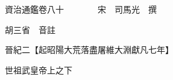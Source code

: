 










 


 
 


 

  
  
  
  
  





  
  
  
  
  
 
  

  

  
  
  



  

 
 

  
   




  

  
  


  　　資治通鑑卷八十　　　　宋　司馬光　撰

　　胡三省　音註

　　晉紀二【起昭陽大荒落盡屠維大淵獻凡七年】

　　世祖武皇帝上之下

